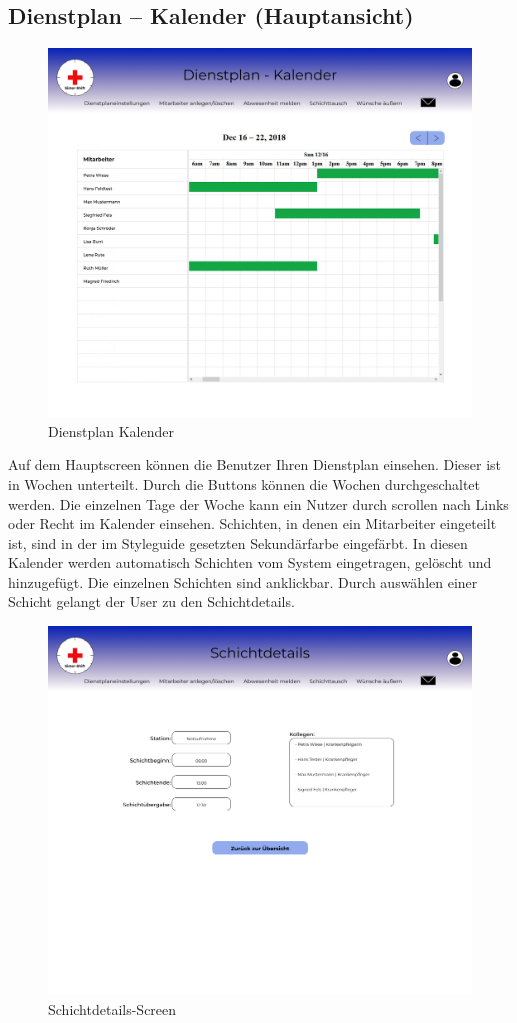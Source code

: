 \documentclass[11pt,
paper=a4,
bibtotocnumbered,	  %
liststotocnumbered,  %
DIV=calc,		  %
tablecaptionabove,	  %
headinclude,
]{article}
\begin{document}
\subsection{Dienstplan – Kalender (Hauptansicht)}
\begin{figure}[H]
\includegraphics[width=1\textwidth]{Bilder/Screens/Hauptfenster-Kalender.jpg}{\centering}
\caption{Dienstplan Kalender}
\end{figure}
Auf dem Hauptscreen können die Benutzer Ihren Dienstplan einsehen. Dieser ist in Wochen unterteilt. Durch die Buttons können die Wochen durchgeschaltet werden. Die einzelnen Tage der Woche kann ein Nutzer durch scrollen nach Links oder Recht im Kalender einsehen. Schichten, in denen ein Mitarbeiter eingeteilt ist, sind in der im Styleguide gesetzten Sekundärfarbe eingefärbt. In diesen Kalender werden automatisch Schichten vom System eingetragen, gelöscht und hinzugefügt. Die einzelnen Schichten sind anklickbar. Durch auswählen einer Schicht gelangt der User zu den Schichtdetails.
\begin{figure}[H]
\includegraphics[width=1\textwidth]{Bilder/Screens/Schichtdetails.jpg}{\centering}
\caption{Schichtdetails-Screen}
\end{figure}
\end{document}
